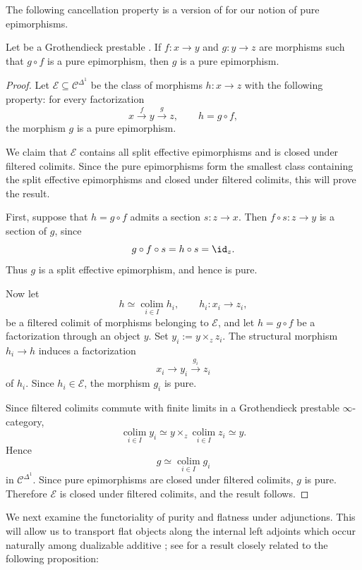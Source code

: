 \documentclass[a4paper,10pt, oneside]{amsart}
\begin{document}
	The following cancellation property is a version of \cite[Lemma 2.5]{martini2025locally} for our notion of pure epimorphisms.
	\begin{lem}\label{lem2.5}
		Let \mcc be a Grothendieck prestable \infcat. If $f: x \rightarrow y$ and $g: y \rightarrow z$ are morphisms such that $g \circ f$ is a pure epimorphism, then $g$ is a pure epimorphism.
	\end{lem}
\begin{proof}
	Let $\mathcal E\subseteq \mathcal C^{\Delta^1}$ be the class of
	morphisms $h:x\to z$ with the following property: for every
	factorization
	\[
	x\xrightarrow{f}y\xrightarrow{g}z,
	\qquad h=g\circ f,
	\]
	the morphism $g$ is a pure epimorphism.
	
	We claim that $\mathcal E$ contains all split effective epimorphisms
	and is closed under filtered colimits. Since the pure epimorphisms form
	the smallest class containing the split effective epimorphisms and
	closed under filtered colimits, this will prove the result.
	
	First, suppose that $h=g\circ f$ admits a section $s:z\to x$. Then
	$f\circ s:z\to y$ is a section of $g$, since
	\[
	g\circ f\circ s=h\circ s=\id_z.
	\]
	Thus $g$ is a split effective epimorphism, and hence is pure.
	
	Now let
	\[
	h\simeq \operatorname*{colim}_{i\in I}h_i,
	\qquad
	h_i:x_i\to z_i,
	\]
	be a filtered colimit of morphisms belonging to $\mathcal E$, and let
	$
	h=g\circ f
	$
	be a factorization through an object $y$. Set
	$
	y_i:=y\times_z z_i.
	$
	The structural morphism $h_i\to h$ induces a factorization
	\[
	x_i\longrightarrow y_i\xrightarrow{g_i}z_i
	\]
	of $h_i$. Since $h_i\in\mathcal E$, the morphism $g_i$ is pure.
	
	Since filtered colimits commute with finite limits in a Grothendieck
	prestable $\infty$-category,
	\[
	\operatorname*{colim}_{i\in I}y_i
	\simeq
	y\times_z\operatorname*{colim}_{i\in I}z_i
	\simeq y.
	\]
	Hence
	\[
	g\simeq\operatorname*{colim}_{i\in I}g_i
	\]
	in $\mathcal C^{\Delta^1}$. Since pure epimorphisms are closed under
	filtered colimits, $g$ is pure. Therefore $\mathcal E$ is closed under
	filtered colimits, and the result follows.
\end{proof}
We next examine the functoriality of purity and flatness under adjunctions. This will allow us to transport flat objects along the internal left adjoints which occur naturally among dualizable additive \infcats; see {\cite[Lemma 2.6]{martini2025locally}} for a result closely related to the following proposition:
\end{document}
